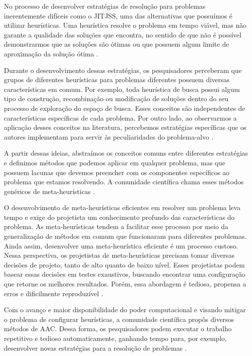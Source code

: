 No processo de desenvolver estratégias de resolução para problemas inerentemente difíceis como o \ac{JITJSS}, uma das alternativas que possuímos é utilizar heurísticas. Uma heurística resolve o problema em tempo viável, mas não garante a qualidade das soluções que encontra, no sentido de que não é possível demonstrarmos que as soluções são ótimas ou que possuem algum limite de aproximação da solução ótima \citep{talbi}.

Durante o desenvolvimento dessas estratégias, os pesquisadores perceberam que grupos de diferentes heurísticas para problemas diferentes possuem diversas características em comum. Por exemplo, toda heurística de busca possui algum tipo de construção, recombinação ou modificação de soluções dentro do seu processo de exploração do espaço de busca. Esses conceitos são independentes de características específicas de cada problema. Por outro lado, ao observarmos a aplicação desses conceitos na literatura, percebemos estratégias específicas que os autores implementam para servir às peculiaridades do problema-alvo \citep{zbb}.

A partir dessas ideias, abstraímos os conceitos comuns entre diferentes estratégias e definimos métodos que podemos aplicar em qualquer problema, mas que possuem lacunas que devemos preencher com os componentes específicos ao problema que estamos resolvendo. A comunidade científica chama esses métodos genéricos de meta-heurísticas \citep{zbb}.

O desenvolvimento de meta-heurísticas eficientes em resolver um problema leva tempo e exige do projetista um conhecimento profundo das características do problema. As meta-heurísticas tendem a facilitar esse processo por meio da generalização de métodos em comum que funcionaram para diferentes problemas. Ainda assim, desenvolver uma meta-heurística eficiente é um processo custoso. Nessa perspectiva, os projetistas de meta-heurísticas precisam tomar diversas decisões de projeto, tanto de alto quanto de baixo nível. Esses projetistas podem basear essas decisões em testes exaustivos, buscando encontrar uma configuração que retorne os melhores resultados. Porém, essa abordagem é tediosa, propensa a erros e dificilmente reproduzível \citep{birattari2009tuning}.

Com o avanço e maior disponibilidade do poder computacional e visando mitigar o problema de configurar heurísticas, a comunidade científica propôs diversos métodos de \ac{AAC}. Dessa forma, os pesquisadores podem executar o trabalho repetitivo e tedioso automaticamente, ganhando tempo para, por exemplo, desenvolver novas estratégias para a resolução de problemas \citep{birattari2009tuning}.

